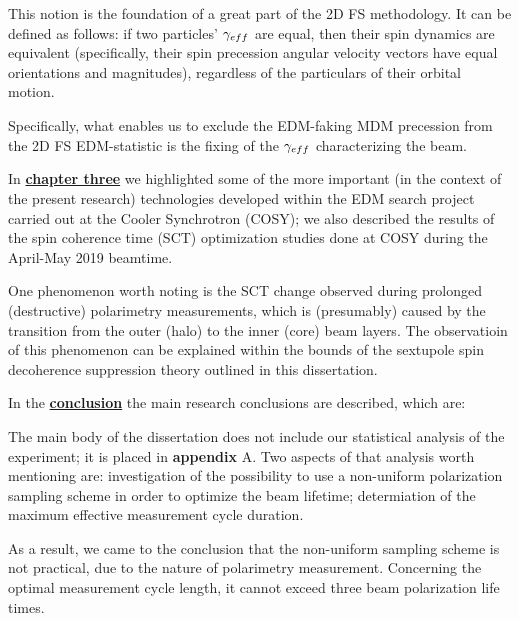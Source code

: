 This notion is the foundation of a great part of the 2D FS methodology. It can be defined as follows: if two particles' $\gamma_{eff}$ are equal, then their spin dynamics are equivalent (specifically, their spin precession angular velocity vectors have equal orientations and magnitudes), regardless of the particulars of their orbital motion. 

Specifically, what enables us to exclude the EDM-faking MDM precession from the 2D FS EDM-statistic is the fixing of the $\gamma_{eff}$ characterizing the beam.

In \underline{\textbf{chapter three}} we highlighted some of the more important (in the context of the present research) technologies developed within the EDM search project carried out at the Cooler Synchrotron (COSY); we also described the results of the spin coherence time (SCT) optimization studies done at COSY during the April-May 2019 beamtime.

One phenomenon worth noting is the SCT change observed during prolonged (destructive) polarimetry measurements, which is (presumably) caused by the transition from the outer (halo) to the inner (core) beam layers. The observatioin of this phenomenon can be explained within the bounds of the sextupole spin decoherence suppression theory outlined in this dissertation.

In the \underline{\textbf{conclusion}} the main research conclusions are described, which are:


The main body of the dissertation does not include our statistical analysis of the experiment; it is placed in \textbf{appendix} A. Two aspects of that analysis worth mentioning are: investigation of the possibility to use a non-uniform polarization sampling scheme in order to optimize the beam lifetime; determiation of the maximum effective measurement cycle duration. 

As a result, we came to the conclusion that the non-uniform sampling scheme is not practical, due to the nature of polarimetry measurement. Concerning the optimal measurement cycle length, it cannot exceed three beam polarization life times.
